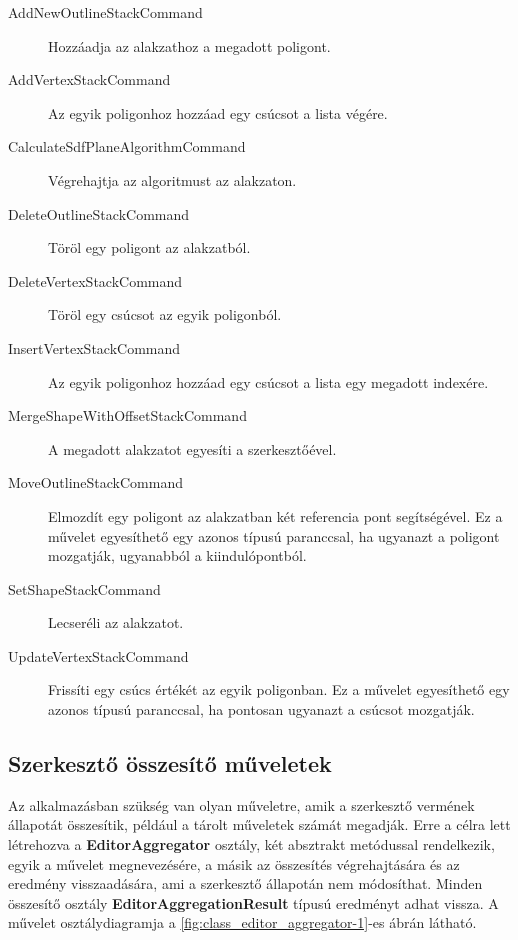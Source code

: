 \begin{description}
	\item[AddNewOutlineStackCommand] Hozzáadja az alakzathoz a megadott poligont.
	\item[AddVertexStackCommand] Az egyik poligonhoz hozzáad egy csúcsot a lista végére.
	\item[CalculateSdfPlaneAlgorithmCommand] Végrehajtja az algoritmust az alakzaton.
	\item[DeleteOutlineStackCommand] Töröl egy poligont az alakzatból.
	\item[DeleteVertexStackCommand] Töröl egy csúcsot az egyik poligonból.
	\item[InsertVertexStackCommand] Az egyik poligonhoz hozzáad egy csúcsot a lista egy megadott indexére.
	\item[MergeShapeWithOffsetStackCommand] A megadott alakzatot egyesíti a szerkesztőével.
	\item[MoveOutlineStackCommand] Elmozdít egy poligont az alakzatban két referencia pont segítségével. Ez a művelet egyesíthető egy azonos típusú paranccsal, ha ugyanazt a poligont mozgatják, ugyanabból a kiindulópontból.
	\item[SetShapeStackCommand] Lecseréli az alakzatot.
	\item[UpdateVertexStackCommand] Frissíti egy csúcs értékét az egyik poligonban. Ez a művelet egyesíthető egy azonos típusú paranccsal, ha pontosan ugyanazt a csúcsot mozgatják.
\end{description}

\subsection{Szerkesztő összesítő műveletek}

Az alkalmazásban szükség van olyan műveletre, amik a szerkesztő vermének állapotát összesítik, például a tárolt műveletek számát megadják. Erre a célra lett létrehozva a \textbf{EditorAggregator} osztály, két absztrakt metódussal rendelkezik, egyik a művelet megnevezésére, a másik az összesítés végrehajtására és az eredmény visszaadására, ami a szerkesztő állapotán nem módosíthat. Minden összesítő osztály \textbf{EditorAggregationResult} típusú eredményt adhat vissza. A művelet osztálydiagramja a \ref{fig:class_editor_aggregator-1}-es ábrán látható.

